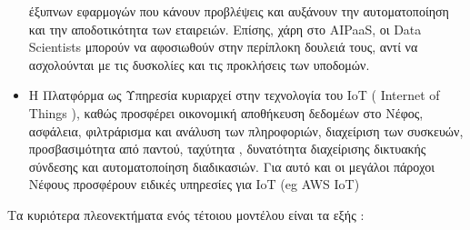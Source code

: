 \documentclass{article}
\begin{document}
\begin{itemize}
έξυπνων εφαρμογών που κάνουν προβλέψεις και αυξάνουν την αυτοματοποίηση
και την αποδοτικότητα των εταιρειών. Επίσης, χάρη στο
AIPaaS, οι
Data Scientists μπορούν να
αφοσιωθούν στην περίπλοκη δουλειά τους, αντί να ασχολούνται με τις
δυσκολίες και τις προκλήσεις των υποδομών.
\item Η Πλατφόρμα ως Υπηρεσία κυριαρχεί στην τεχνολογία του
IoT ( Internet of Things ),
καθώς προσφέρει οικονομική αποθήκευση δεδομέων στο Νέφος, ασφάλεια,
φιλτράρισμα και ανάλυση των πληροφοριών, διαχείριση των συσκευών,
προσβασιμότητα από παντού, ταχύτητα , δυνατότητα διαχείρισης δικτυακής
σύνδεσης και αυτοματοποίηση διαδικασιών. Για αυτό και οι μεγάλοι πάροχοι
Νέφους προσφέρουν ειδικές υπηρεσίες για IoT (eg
AWS IoT)
\end{itemize}
Τα κυριότερα πλεονεκτήματα ενός τέτοιου μοντέλου είναι τα εξής :
\end{document}

